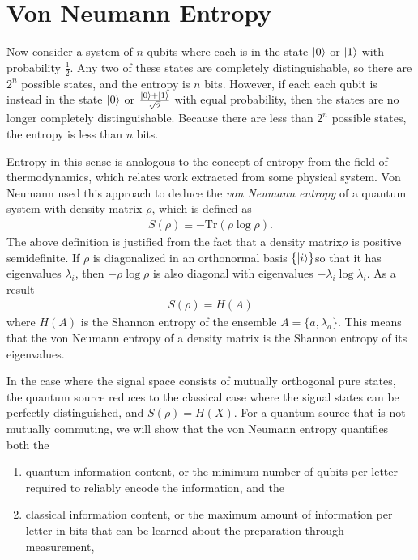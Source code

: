 \documentclass[a4paper, 12pt]{article}
\numberwithin{equation}{section}
\numberwithin{figure}{section}
\theoremstyle{definition}
\begin{document}
    \section{Von Neumann Entropy}
    Now consider a system of $n$ qubits where each is in the state $\ket{0}$ or $\ket{1}$ with probability $\frac{1}{2}$. Any two of these states are completely distinguishable, so there are $2^n$ possible states, and the entropy is $n$ bits. However, if each each qubit is instead in the state $\ket{0}$ or $\frac{\ket{0} + \ket{1}}{\sqrt{2}}$ with equal probability, then the states are no longer completely distinguishable. Because there are less than $2^n$ possible states, the entropy is less than $n$ bits. \par
    Entropy in this sense is analogous to the concept of entropy from the field of thermodynamics, which relates work extracted from some physical system. Von Neumann used this approach to deduce the \textit{von Neumann entropy} of a quantum system with density matrix $\rho$, which is defined as
    \begin{align}
        S(\rho) \equiv -\text{Tr}(\rho \log\rho).
    \end{align}
    The above definition is justified from the fact that a density matrix$\rho$ is positive semidefinite. If $\rho$ is diagonalized in an orthonormal basis $\{ \ket{i} \}$so that it has eigenvalues $\lambda_i$, then $-\rho \log\rho$ is also diagonal with eigenvalues $-\lambda_i \log\lambda_i$. As a result
    \begin{align}
        S(\rho) = H(A)
    \end{align}
    where $H(A)$ is the Shannon entropy of the ensemble $A = \{ a, \lambda_a \}$. This means that the von Neumann entropy of a density matrix is the Shannon entropy of its eigenvalues. \par
    In the case where the signal space consists of mutually orthogonal pure states, the quantum source reduces to the classical case where the signal states can be perfectly distinguished, and $S(\rho) = H(X)$. For a quantum source that is not mutually commuting, we will show that the von Neumann entropy quantifies both the
    \begin{enumerate}
        \item
            quantum information content, or the minimum number of qubits per letter required to reliably encode the information, and the
        \item
            classical information content, or the maximum amount of information per letter in bits that can be learned about the preparation through measurement,
    \end{enumerate}
\end{document}
